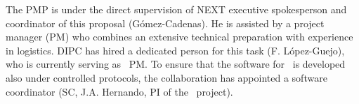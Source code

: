 %
 

\indent

The PMP is under the direct supervision of NEXT executive spokesperson and coordinator of this proposal (G\'omez-Cadenas). He is assisted by a project manager (PM) who combines an extensive technical preparation with experience in logistics. DIPC has hired a dedicated person for this task (F. L\'opez-Guejo), who is currently serving as \Next\ PM. To ensure that the software for \NHD\ is developed also under controlled protocols, the collaboration has appointed a software coordinator (SC, J.A. Hernando, PI of the \sUSC\ project). 

